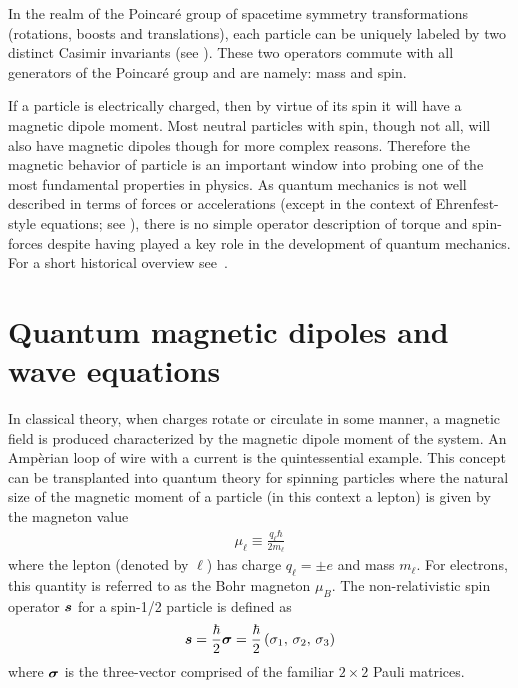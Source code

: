 In the realm of the Poincar{\'e} group of spacetime symmetry transformations (rotations, boosts and translations), each particle can be uniquely labeled by two distinct Casimir invariants (see ). These two operators commute with all generators of the Poincar{\'e} group and are namely: mass and spin.

If a particle is electrically charged, then by virtue of its spin it will have a magnetic dipole moment. Most neutral particles with spin, though not all, will also have magnetic dipoles though for more complex reasons. Therefore the magnetic behavior of particle is an important window into probing one of the most fundamental properties in physics. As quantum mechanics is not well described in terms of forces or accelerations (except in the context of Ehrenfest-style equations; see ), there is no simple operator description of torque and spin-forces despite having played a key role in the development of quantum mechanics. For a short historical overview see~\cite{ohanian1986spin}.

\section{Quantum magnetic dipoles and wave equations}
\label{sec:mom}
In classical theory, when charges rotate or circulate in some manner, a magnetic field is produced characterized by the magnetic dipole moment of the system. An Amp{\`e}rian loop of wire with a current is the quintessential example. This concept can be transplanted into quantum theory for spinning particles where the natural size of the magnetic moment of a particle (in this context a lepton) is given by the magneton value
\begin{align}
    \label{mag:1}
    \mu_{\ell}\equiv\frac{q_{\ell}\hbar}{2m_{\ell}}
\end{align}
where the lepton (denoted by $\ell$) has charge $q_{\ell}=\pm e$ and mass $m_{\ell}$. For electrons, this quantity is referred to as the Bohr magneton $\mu_{B}$. The non-relativistic spin operator $\boldsymbol{s}$ for a spin-1/2 particle is defined as
\begin{align}
    \label{qspin:1}
    \boldsymbol{ s}=\frac{\hbar}{2}\boldsymbol{\sigma}=\frac{\hbar}{2}\left(\sigma_{1},\,\sigma_{2},\,\sigma_{3}\right)
\end{align}
where $\boldsymbol{\sigma}$ is the three-vector comprised of the familiar $2\times2$ Pauli matrices.

